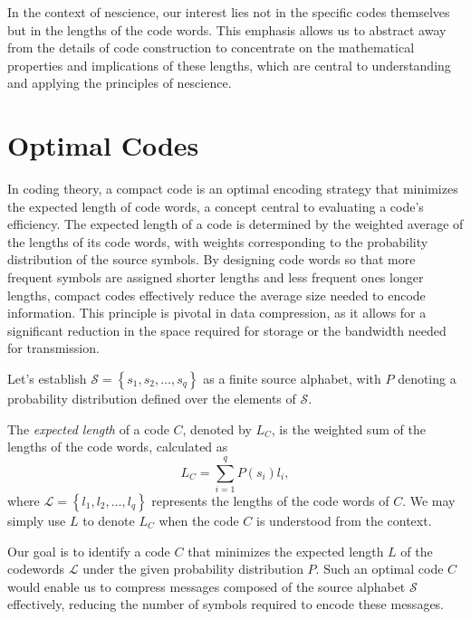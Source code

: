 In the context of nescience, our interest lies not in the specific codes themselves but in the lengths of the code words. This emphasis allows us to abstract away from the details of code construction to concentrate on the mathematical properties and implications of these lengths, which are central to understanding and applying the principles of nescience.

%
%

\section{Optimal Codes}
\label{sec:Optimal-Codes}

In coding theory, a compact code is an optimal encoding strategy that minimizes the expected length of code words, a concept central to evaluating a code's efficiency. The expected length of a code is determined by the weighted average of the lengths of its code words, with weights corresponding to the probability distribution of the source symbols. By designing code words so that more frequent symbols are assigned shorter lengths and less frequent ones longer lengths, compact codes effectively reduce the average size needed to encode information. This principle is pivotal in data compression, as it allows for a significant reduction in the space required for storage or the bandwidth needed for transmission.

Let's establish $\mathcal{S}=\left\{ s_{1},s_{2},\ldots,s_{q}\right\}$ as a finite source alphabet, with $P$ denoting a probability distribution defined over the elements of $\mathcal{S}$.

\begin{definition}
The \emph{expected length} of a code $C$, denoted by $L_{C}$, is the weighted sum of the lengths of the code words, calculated as
\[
L_{C} = \sum_{i=1}^{q} P(s_{i})l_{i},
\]
where $\mathcal{L} = \left\{ l_{1},l_{2},\ldots,l_{q}\right\}$ represents the lengths of the code words of $C$. We may simply use $L$ to denote $L_{C}$ when the code $C$ is understood from the context.
\end{definition}

Our goal is to identify a code $C$ that minimizes the expected length $L$ of the codewords $\mathcal{L}$ under the given probability distribution $P$. Such an optimal code $C$ would enable us to compress messages composed of the source alphabet $\mathcal{S}$ effectively, reducing the number of symbols required to encode these messages.

